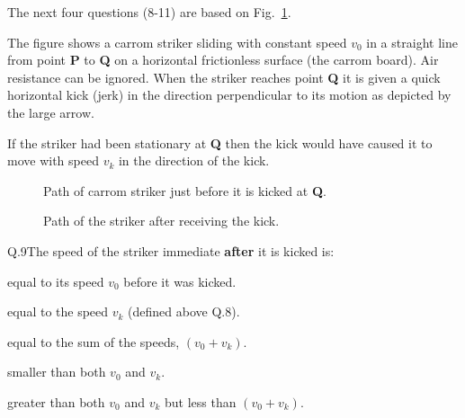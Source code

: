     \newpage
    The next four questions (8-11) are based on Fig.~\ref{fig:carrom-kick}.

    The figure shows a carrom striker sliding with constant speed $v_0$ in a straight line from point \textbf{P} to \textbf{Q} on a horizontal frictionless surface (the carrom board).
    Air resistance can be ignored.
    When the striker reaches point \textbf{Q} it is given a quick horizontal kick (jerk) in the direction perpendicular to its motion as depicted by the large arrow.

    If the striker had been stationary at \textbf{Q} then the kick would have caused it to move with speed $v_k$ in the direction of the kick.

    \begin{figure}[h!]
        \begin{center}
            
        \end{center}
        \caption{\label{fig:carrom-kick} Path of carrom striker just before it is kicked at \textbf{Q}.}
    \end{figure}


    \begin{figure}[h!]
        \begin{center}
            
        \end{center}
        \caption{\label{fig:carrom-paths} Path of the striker after receiving the kick.}
    \end{figure}

    \begin{mcq}{Q.9}{The speed of the striker immediate \textbf{after} it is kicked is:}
        \item equal to its speed $v_0$ before it was kicked.
        \item equal to the speed $v_k$ (defined above Q.8).
        \item equal to the sum of the speeds, $(v_0 + v_k)$.
        \item smaller than both $v_0$ and $v_k$.
        \item greater than both $v_0$ and $v_k$ but less than $(v_0 + v_k)$.
    \end{mcq}


